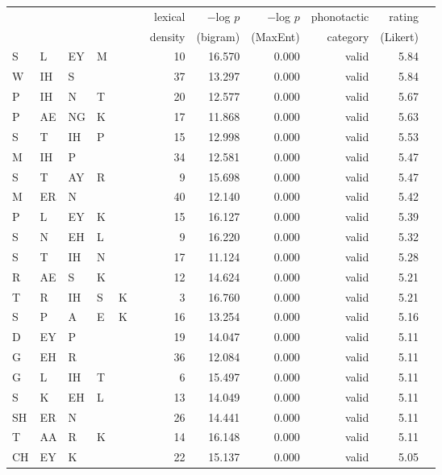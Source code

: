 \begin{longtable}{l@{ } l@{ } l@{ } l@{ } l@{ } l r r r r r r} 
\toprule
   &    &    &    &    &   & lexical & $-$log $p$ & $-$log $p$ & phonotactic & rating \\
   &    &    &    &    &   & density & (bigram) & (MaxEnt) & category & (Likert) \\
\midrule
S  & L  & EY & M  &    &   & 10 & 16.570 & 0.000 & valid   & 5.84 \\
W  & IH & S  &    &    &   & 37 & 13.297 & 0.000 & valid   & 5.84 \\
P  & IH & N  & T  &    &   & 20 & 12.577 & 0.000 & valid   & 5.67 \\
P  & AE & NG & K  &    &   & 17 & 11.868 & 0.000 & valid   & 5.63 \\
S  & T  & IH & P  &    &   & 15 & 12.998 & 0.000 & valid   & 5.53 \\
M  & IH & P  &    &    &   & 34 & 12.581 & 0.000 & valid   & 5.47 \\
S  & T  & AY & R  &    &   &  9 & 15.698 & 0.000 & valid   & 5.47 \\
M  & ER & N  &    &    &   & 40 & 12.140 & 0.000 & valid   & 5.42 \\
P  & L  & EY & K  &    &   & 15 & 16.127 & 0.000 & valid   & 5.39 \\
S  & N  & EH & L  &    &   &  9 & 16.220 & 0.000 & valid   & 5.32 \\
S  & T  & IH & N  &    &   & 17 & 11.124 & 0.000 & valid   & 5.28 \\
R  & AE & S  & K  &    &   & 12 & 14.624 & 0.000 & valid   & 5.21 \\
T  & R  & IH & S  & K  &   &  3 & 16.760 & 0.000 & valid   & 5.21 \\
S  & P  & A  & E  & K  &   & 16 & 13.254 & 0.000 & valid   & 5.16 \\
D  & EY & P  &    &    &   & 19 & 14.047 & 0.000 & valid   & 5.11 \\
G  & EH & R  &    &    &   & 36 & 12.084 & 0.000 & valid   & 5.11 \\
G  & L  & IH & T  &    &   &  6 & 15.497 & 0.000 & valid   & 5.11 \\
S  & K  & EH & L  &    &   & 13 & 14.049 & 0.000 & valid   & 5.11 \\
SH & ER & N  &    &    &   & 26 & 14.441 & 0.000 & valid   & 5.11 \\
T  & AA & R  & K  &    &   & 14 & 16.148 & 0.000 & valid   & 5.11 \\
CH & EY & K  &    &    &   & 22 & 15.137 & 0.000 & valid   & 5.05 \\

\end{longtable}
